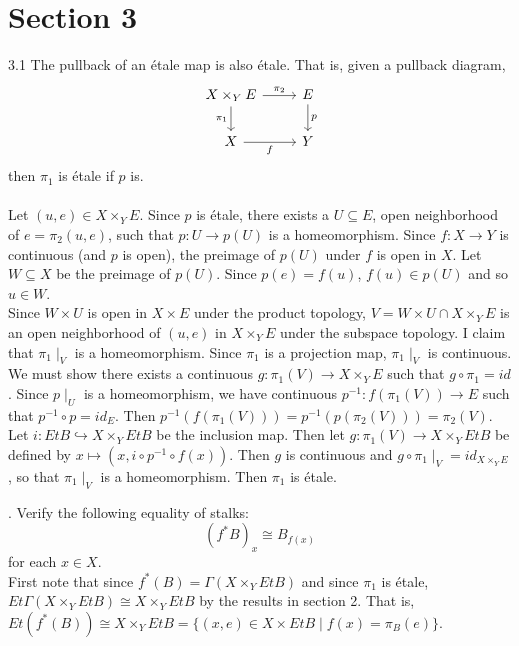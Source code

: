 \newpage
\section*{Section 3}
3.1 The pullback of an \'etale map is also \'etale. That is, given a pullback diagram, 
\[
\begin{tikzcd}
X \times_Y E \arrow[r, "\pi_2"] \arrow[d, "\pi_1"']
& E \arrow[d, "p"] \\
X \arrow[r, "f"']
& Y
\end{tikzcd}
\]
then $\pi_1$ is \'etale if $p$ is.\\\\
Let $(u,e) \in X \times_Y E$. Since $p$ is \'etale, there exists a $U \subseteq E$, open neighborhood of $e = \pi_2(u,e)$, such that $p:U \rightarrow p(U)$ is a homeomorphism. Since $f: X \rightarrow Y$ is continuous (and $p$ is open), the preimage of $p(U)$ under $f$ is open in $X$. Let $W \subseteq X$ be the preimage of $p(U)$. Since $p(e) = f(u)$, $f(u) \in p(U)$ and so $u \in W$.\\

Since $W \times U$ is open in $X \times E$ under the product topology, $V = W \times U \cap X \times_Y E $ is an open neighborhood of $(u,e)$ in $X \times_Y E $ under the subspace topology. I claim that $\pi_1 \mid_V$ is a homeomorphism. Since $\pi_1$ is a projection map, $\pi_1 \mid_V$ is continuous. We must show there exists a continuous $g: \pi_1(V) \rightarrow X \times_Y E$ such that $g \circ \pi_1 = id$. Since $p \mid_U$ is a homeomorphism, we have continuous $p^{-1}: f(\pi_1(V)) \rightarrow E$ such that $p^{-1} \circ p = id_E$. Then $p^{-1}(f(\pi_1(V))) = p^{-1}(p(\pi_2(V)))=\pi_2(V)$. Let $i: EtB \hookrightarrow X \times_Y EtB$ be the inclusion map. Then let $g: \pi_1(V) \rightarrow X \times_Y EtB$ be defined by $x \mapsto (x, i \circ p^{-1} \circ f(x))$. Then $g$ is continuous and $g \circ \pi_1 \mid_V = id_{X \times_Y E}$, so that $\pi_1 \mid_V$ is a homeomorphism. Then $\pi_1$ is \'etale. 

. Verify the following equality of stalks:
\[ (f^*B)_x \cong B_{f(x)}\]
for each $x \in X$. \\

First note that since $f^*(B) = \Gamma (X \times_Y EtB)$ and since $\pi_1$ is \'etale, $Et \Gamma(X \times_Y EtB) \cong X \times_Y EtB$ by the results in section 2. That is, $Et(f^*(B)) \cong X \times_Y EtB = \{(x,e) \in X \times EtB \mid f(x) = \pi_B(e)\}$.\\

